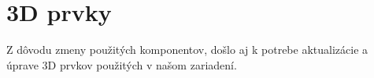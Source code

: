 

\section{3D prvky}
\label{kap:2.4}

Z dôvodu zmeny použitých komponentov, došlo aj k potrebe aktualizácie a úprave 3D prvkov použitých v našom zariadení. 